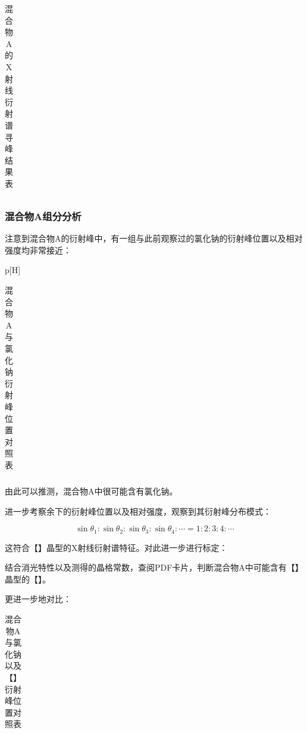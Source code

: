 \documentclass{thuemp}
\begin{document}
\begin{table}
    \centering
    \captionnamefont{\wuhao\bf\heiti}
    \captiontitlefont{\wuhao\bf\heiti}
    \caption{混合物A的X射线衍射谱寻峰结果表}
    \label{tab:mixture_a_xrd}
    \liuhao
    \begin{tabular}{ccccc}
        \toprule
        \midrule
        \bottomrule
    \end{tabular}
\end{table}

\subsubsection{混合物A组分分析}

注意到混合物A的衍射峰中，有一组与此前观察过的氯化钠的衍射峰位置以及相对强度均非常接近：

\begin{table}p[H]
    \centering
    \captionnamefont{\wuhao\bf\heiti}
    \captiontitlefont{\wuhao\bf\heiti}
    \caption{混合物A与氯化钠衍射峰位置对照表}
    \label{tab:mixture_a_nacl_peaks}
    \liuhao
    \begin{tabular}{ccccc}
        \toprule
        \midrule
        \bottomrule
    \end{tabular}
\end{table}

由此可以推测，混合物A中很可能含有氯化钠。

进一步考察余下的衍射峰位置以及相对强度，观察到其衍射峰分布模式：

\begin{equation}
    \sin{\theta_1} : \sin{\theta_2} :\sin{\theta_3} : \sin{\theta_4} : \cdots = 1 : 2 : 3 : 4 : \cdots
    \label{eq:mixture_a_diff_patt}
\end{equation}

这符合【】晶型的X射线衍射谱特征。对此进一步进行标定：

结合消光特性以及测得的晶格常数，查阅PDF卡片，判断混合物A中可能含有【】晶型的【】。

更进一步地对比：

\begin{table}[H]
    \centering
    \captionnamefont{\wuhao\bf\heiti}
    \captiontitlefont{\wuhao\bf\heiti}
    \caption{混合物A与氯化钠以及【】衍射峰位置对照表}
    \label{tab:mixture_a_unknow_peaks}
    \liuhao
    \begin{tabular}{ccccc}
        \toprule
        \midrule
        \bottomrule
    \end{tabular}
\end{table}
\end{document}
